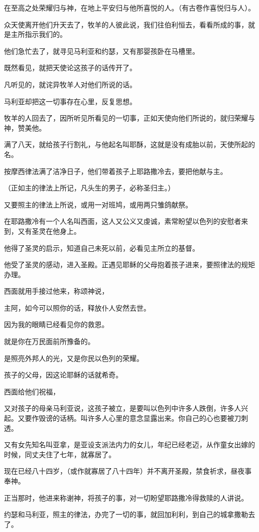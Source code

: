 \documentclass[12pt,oneside]{book}
\begin{document}
在至高之处荣耀归与神，在地上平安归与他所喜悦的人。（有古卷作喜悦归与人）。

众天使离开他们升天去了，牧羊的人彼此说，我们往伯利恒去，看看所成的事，就是主所指示我们的。

他们急忙去了，就寻见马利亚和约瑟，又有那婴孩卧在马槽里。

既然看见，就把天使论这孩子的话传开了。

凡听见的，就诧异牧羊人对他们所说的话。

马利亚却把这一切事存在心里，反复思想。

牧羊的人回去了，因所听见所看见的一切事，正如天使向他们所说的，就归荣耀与神，赞美他。

满了八天，就给孩子行割礼，与他起名叫耶酥，这就是没有成胎以前，天使所起的名。

按摩西律法满了洁净日子，他们带着孩子上耶路撒冷去，要把他献与主。

（正如主的律法上所记，凡头生的男子，必称圣归主。）

又要照主的律法上所说，或用一对班鸠，或用两只雏鸽献祭。

在耶路撒冷有一个人名叫西面，这人又公义又虔诚，素常盼望以色列的安慰者来到，又有圣灵在他身上。

他得了圣灵的启示，知道自己未死以前，必看见主所立的基督。

他受了圣灵的感动，进入圣殿。正遇见耶稣的父母抱着孩子进来，要照律法的规矩办理。

西面就用手接过他来，称颂神说，

主阿，如今可以照你的话，释放仆人安然去世。

因为我的眼睛已经看见你的救恩。

就是你在万民面前所豫备的。

是照亮外邦人的光，又是你民以色列的荣耀。

孩子的父母，因这论耶稣的话就希奇。

西面给他们祝福，

又对孩子的母亲马利亚说，这孩子被立，是要叫以色列中许多人跌倒，许多人兴起。又要作毁谤的话柄。叫许多人心里的意念显露出来。你自己的心也要被刀刺透。

又有女先知名叫亚拿，是亚设支派法内力的女儿，年纪已经老迈，从作童女出嫁的时候，同丈夫住了七年，就寡居了。

现在已经八十四岁，（或作就寡居了八十四年）并不离开圣殿，禁食祈求，昼夜事奉神。

正当那时，他进来称谢神，将孩子的事，对一切盼望耶路撒冷得救赎的人讲说。

约瑟和马利亚，照主的律法，办完了一切的事，就回加利利，到自己的城拿撒勒去了。
\end{document}
